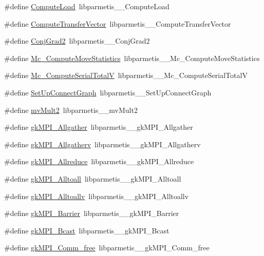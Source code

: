\begin{DoxyCompactItemize}
\#define \hyperlink{a00960_a77806e562d132c2a33c00db82deb181e}{Compute\+Load}~libparmetis\+\_\+\+\_\+\+Compute\+Load
\item 
\#define \hyperlink{a00960_a7db2792384cff1ac0a8ea2115ccd5e63}{Compute\+Transfer\+Vector}~libparmetis\+\_\+\+\_\+\+Compute\+Transfer\+Vector
\item 
\#define \hyperlink{a00960_a8d90c400cffbe779b3459da2d4fd8986}{Conj\+Grad2}~libparmetis\+\_\+\+\_\+\+Conj\+Grad2
\item 
\#define \hyperlink{a00960_a017cc0bce86b51ceb6ebe4848091507b}{Mc\+\_\+\+Compute\+Move\+Statistics}~libparmetis\+\_\+\+\_\+\+Mc\+\_\+\+Compute\+Move\+Statistics
\item 
\#define \hyperlink{a00960_ae3a7b49d4f6eabfb916e412246a3aca6}{Mc\+\_\+\+Compute\+Serial\+TotalV}~libparmetis\+\_\+\+\_\+\+Mc\+\_\+\+Compute\+Serial\+TotalV
\item 
\#define \hyperlink{a00960_aa72393d13d070668de0bdb460dcb3c77}{Set\+Up\+Connect\+Graph}~libparmetis\+\_\+\+\_\+\+Set\+Up\+Connect\+Graph
\item 
\#define \hyperlink{a00960_ab1fda80579f706c63ac2f59abdefe205}{mv\+Mult2}~libparmetis\+\_\+\+\_\+mv\+Mult2
\item 
\#define \hyperlink{a00960_a17d61e917271bd6401140c0b6de9982e}{gk\+M\+P\+I\+\_\+\+Allgather}~libparmetis\+\_\+\+\_\+gk\+M\+P\+I\+\_\+\+Allgather
\item 
\#define \hyperlink{a00960_a64fa7b50eb227b15bbaeca6282ab1bd4}{gk\+M\+P\+I\+\_\+\+Allgatherv}~libparmetis\+\_\+\+\_\+gk\+M\+P\+I\+\_\+\+Allgatherv
\item 
\#define \hyperlink{a00960_a83b715132bcafe4d38cff9027bffcebb}{gk\+M\+P\+I\+\_\+\+Allreduce}~libparmetis\+\_\+\+\_\+gk\+M\+P\+I\+\_\+\+Allreduce
\item 
\#define \hyperlink{a00960_a29e5fbfb25d07699a87b1a5a7d430679}{gk\+M\+P\+I\+\_\+\+Alltoall}~libparmetis\+\_\+\+\_\+gk\+M\+P\+I\+\_\+\+Alltoall
\item 
\#define \hyperlink{a00960_a28c3077cc5f2204191a2b0a5ee938e5b}{gk\+M\+P\+I\+\_\+\+Alltoallv}~libparmetis\+\_\+\+\_\+gk\+M\+P\+I\+\_\+\+Alltoallv
\item 
\#define \hyperlink{a00960_a2e3dc0708c9b1ba0aa67b8138b878d00}{gk\+M\+P\+I\+\_\+\+Barrier}~libparmetis\+\_\+\+\_\+gk\+M\+P\+I\+\_\+\+Barrier
\item 
\#define \hyperlink{a00960_a893056bf0cbf8dffb8e069a06311ab10}{gk\+M\+P\+I\+\_\+\+Bcast}~libparmetis\+\_\+\+\_\+gk\+M\+P\+I\+\_\+\+Bcast
\item 
\#define \hyperlink{a00960_a489557dc9b6fe8caade84cad97e4f458}{gk\+M\+P\+I\+\_\+\+Comm\+\_\+free}~libparmetis\+\_\+\+\_\+gk\+M\+P\+I\+\_\+\+Comm\+\_\+free

\end{DoxyCompactItemize}
